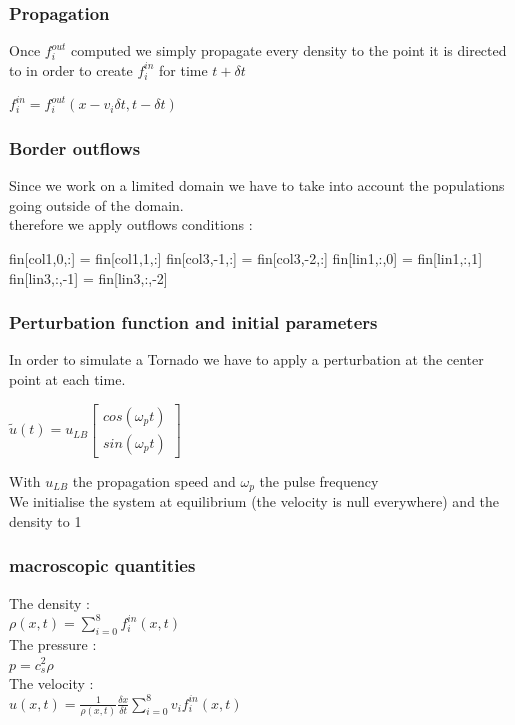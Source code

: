 \documentclass{beamer}
\begin{document}
\begin{frame}[fragile]
\frametitle{Propagation}
Once $f_{i}^{out}$ computed we simply propagate every density to the point it is directed to in order to create $f_{i}^{in}$ for time $t+\delta t$\\
\bigskip
\begin{center}
\begin{large}
$ f_{i}^{in} = f_{i}^{out}(x-v_{i}\delta t, t-\delta t)$
\end{large}
\end{center}
\end{frame}


\begin{frame}[fragile]
\frametitle{Border outflows}
Since we work on a limited domain we have to take into account the populations going outside of the domain.\\
\bigskip\bigskip
therefore we apply outflows conditions :\\
\begin{python}
fin[col1,0,:] = fin[col1,1,:]
fin[col3,-1,:] = fin[col3,-2,:]
fin[lin1,:,0] = fin[lin1,:,1]
fin[lin3,:,-1] = fin[lin3,:,-2]
\end{python}
\end{frame}

\begin{frame}[fragile]
\frametitle{Perturbation function and initial parameters}
In order to simulate a Tornado we have to apply a perturbation at the center point at each time.\\
\begin{center}
\begin{large}
$\tilde{u}(t) = u_{LB}\begin{bmatrix}
           cos(\omega_{p}t) \\
           sin(\omega_{p}t)
         \end{bmatrix}$
\end{large}
\end{center}
With $u_{LB}$ the propagation speed and $\omega_{p}$ the pulse frequency\\
\bigskip\bigskip
We initialise the system at equilibrium (the velocity is null everywhere) and the density to 1
\end{frame}

\begin{frame}[fragile]
\frametitle{macroscopic quantities}
The density :\\
$\rho(x, t) = \displaystyle\sum_{i=0}^{8} f_{i}^{in}(x,t)$\\
\bigskip
The pressure :\\
$p = c_{s}^{2}\rho$\\
\bigskip
The velocity :\\
$u(x,t) = \frac{1}{\rho (x,t)}\frac{\delta x}{\delta t}\displaystyle\sum_{i=0}^{8}v_{i}f_{i}^{in}(x,t)$
\end{frame}
\end{document}

